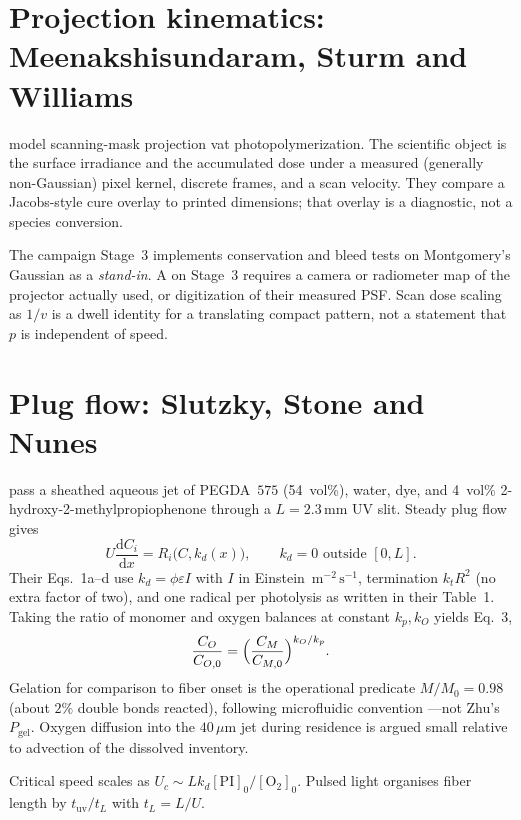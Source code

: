 \section{Projection kinematics: Meenakshisundaram, Sturm and Williams}

\citet{Meenakshisundaram2020} model scanning-mask projection vat photopolymerization.
The scientific object is the surface irradiance and the accumulated dose under a measured (generally non-Gaussian) pixel kernel, discrete frames, and a scan velocity.
They compare a Jacobs-style cure overlay to printed dimensions; that overlay is a diagnostic, not a species conversion.

The campaign Stage~3 implements conservation and bleed tests on Montgomery's Gaussian as a \emph{stand-in}.
A \tagmatch{} on Stage~3 requires a camera or radiometer map of the projector actually used, or digitization of their measured PSF.
Scan dose scaling as $1/v$ is a dwell identity for a translating compact pattern, not a statement that $p$ is independent of speed.

\section{Plug flow: Slutzky, Stone and Nunes}

\citet{Slutzky2019} pass a sheathed aqueous jet of PEGDA~$575$ (54~vol\%), water, dye, and 4~vol\% 2-hydroxy-2-methylpropiophenone through a $L=2.3\,\mathrm{mm}$ UV slit.
Steady plug flow gives
\begin{equation}
  U\frac{\mathrm{d}C_i}{\mathrm{d}x}=R_i\bigl(C,k_d(x)\bigr),\qquad
  k_d=0\text{ outside }[0,L].
\end{equation}
Their Eqs.~1a--d use $k_d=\phi\varepsilon I$ with $I$ in Einstein~$\mathrm{m^{-2}\,s^{-1}}$, termination $k_t R^2$ (no extra factor of two), and one radical per photolysis as written in their Table~1.
Taking the ratio of monomer and oxygen balances at constant $k_p,k_O$ yields Eq.~3,
\begin{equation}
  \frac{C_O}{C_{O,0}}=\Bigl(\frac{C_M}{C_{M,0}}\Bigr)^{k_O/k_p}.
\end{equation}
Gelation for comparison to fiber onset is the operational predicate $M/M_0=0.98$ (about $2\%$ double bonds reacted), following microfluidic convention \citep{Dendukuri2008}---not Zhu's $P_{\mathrm{gel}}$.
Oxygen diffusion into the $40\,\mu\mathrm{m}$ jet during residence is argued small relative to advection of the dissolved inventory.

Critical speed scales as $U_c\sim L k_d [\mathrm{PI}]_0/[\mathrm{O}_2]_0$.
Pulsed light organises fiber length by $t_{\mathrm{uv}}/t_L$ with $t_L=L/U$.

